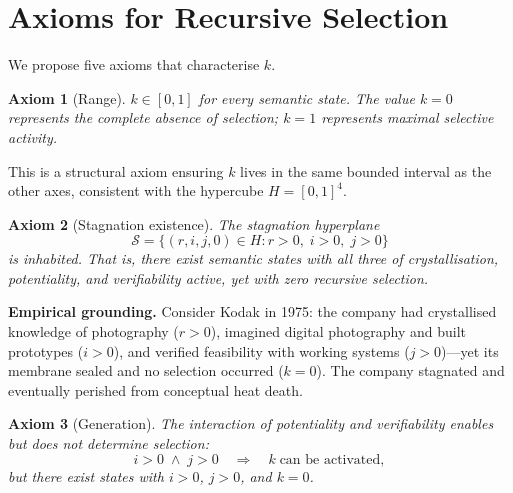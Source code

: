 \documentclass[11pt,a4paper]{article}
\newtheorem{axiom}{Axiom}
\newcommand{\rey}[1]{{\color{rcolor}#1}}
\newcommand{\imag}[1]{{\color{icolor}#1}}
\newcommand{\exac}[1]{{\color{jcolor}#1}}
\newcommand{\recu}[1]{{\color{kcolor}#1}}
\def\rey#1{#1}%
\def\imag#1{#1}%
\def\exac#1{#1}%
\def\recu#1{#1}%
\begin{document}
\section{Axioms for Recursive Selection}
\label{sec:axioms}

We propose five axioms that characterise $\recu{k}$.

\begin{axiombox}
\begin{axiom}[Range]\label{ax:range}
$\recu{k} \in [0,1]$ for every semantic state. The value $k=0$
represents the complete absence of selection; $k=1$ represents maximal
selective activity.
\end{axiom}
\end{axiombox}

This is a structural axiom ensuring $\recu{k}$ lives in the same
bounded interval as the other axes, consistent with the hypercube
$H = [0,1]^4$.

\begin{axiombox}
\begin{axiom}[Stagnation existence]\label{ax:stag}
The \emph{stagnation hyperplane}
\[
  \mathcal{S} = \{(r,i,j,0) \in H : r > 0,\; i > 0,\; j > 0\}
\]
is inhabited. That is, there exist semantic states with all three of
crystallisation, potentiality, and verifiability active, yet with zero
recursive selection.
\end{axiom}
\end{axiombox}

\noindent\textbf{Empirical grounding.} Consider Kodak in 1975: the
company had crystallised knowledge of photography ($\rey{r} > 0$),
imagined digital photography and built prototypes ($\imag{i} > 0$),
and verified feasibility with working systems ($\exac{j} > 0$)---yet
its membrane sealed and no selection occurred ($\recu{k} = 0$). The
company stagnated and eventually perished from conceptual heat death.

\begin{axiombox}
\begin{axiom}[Generation]\label{ax:gen}
The interaction of potentiality and verifiability \emph{enables} but
does not \emph{determine} selection:
\[
  \imag{i} > 0 \;\wedge\; \exac{j} > 0 \quad\Longrightarrow\quad
  \recu{k} \;\text{can be activated},
\]
but there exist states with $\imag{i} > 0$, $\exac{j} > 0$, and
$\recu{k} = 0$.
\end{axiom}
\end{axiombox}
\end{document}
